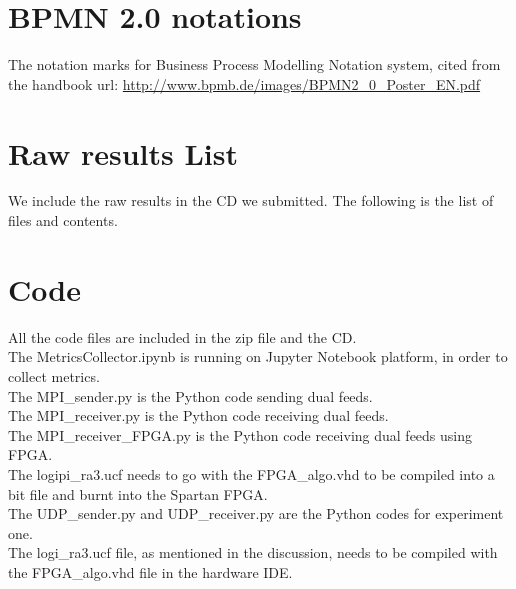 \documentclass[11pt,openright,a4paper]{report}
\begin{document}
\chapter{BPMN 2.0 notations}
The notation marks for Business Process Modelling Notation system, cited from the handbook url: \url{http://www.bpmb.de/images/BPMN2_0_Poster_EN.pdf}

\chapter{Raw results List}
We include the raw results in the CD we submitted. The following is the list of files and contents.

\chapter{Code}
All the code files are included in the zip file and the CD.\\
The MetricsCollector.ipynb is running on Jupyter Notebook platform, in order to collect metrics.\\
The MPI\_sender.py is the Python code sending dual feeds.\\
The MPI\_receiver.py is the Python code receiving dual feeds.\\
The MPI\_receiver\_FPGA.py is the Python code receiving dual feeds using FPGA.\\
The logipi\_ra3.ucf needs to go with the FPGA\_algo.vhd to be compiled into a bit file and burnt into the Spartan FPGA.\\
The UDP\_sender.py and UDP\_receiver.py are the Python codes for experiment one.\\
The logi\_ra3.ucf file, as mentioned in the discussion, needs to be compiled with the FPGA\_algo.vhd file in the hardware IDE.\\
\end{document}
